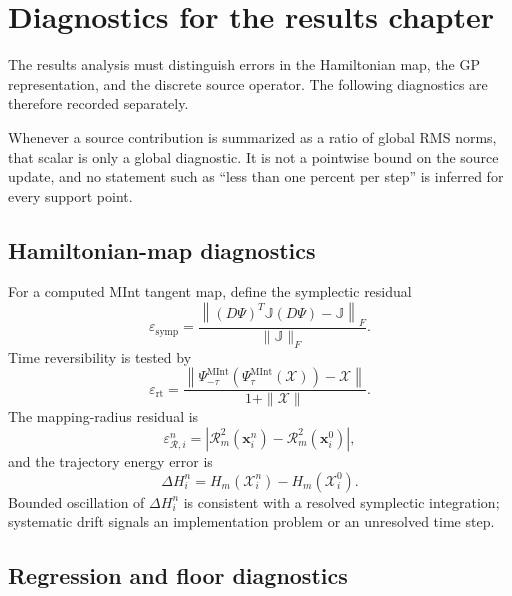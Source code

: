 \documentclass[
  11pt,
  letterpaper,
  onehalfspacing,
  normalmargins,
  equalmargins,
  oneside
]{ut-thesis}
\begin{document}
\section{Diagnostics for the results chapter}
\label{sec:ch5-diagnostics}

The results analysis must distinguish errors in the Hamiltonian map, the GP
representation, and the discrete source operator. The following diagnostics
are therefore recorded separately.

Whenever a source contribution is summarized as a ratio of global RMS norms,
that scalar is only a global diagnostic. It is not a pointwise bound on the
source update, and no statement such as ``less than one percent per step'' is
inferred for every support point.


\subsection{Hamiltonian-map diagnostics}
\label{subsec:ch5-map-diagnostics}

For a computed MInt tangent map, define the symplectic residual
\begin{equation}
\varepsilon_{\mathrm{symp}}
=
\frac{
\left\|
(D\Psi)^T\mathbb J(D\Psi)-\mathbb J
\right\|_F
}{
\|\mathbb J\|_F
}.
\label{eq:ch5-symplectic-residual}
\end{equation}
Time reversibility is tested by
\begin{equation}
\varepsilon_{\mathrm{rt}}
=
\frac{
\left\|
\Psi_{-\tau}^{\mathrm{MInt}}
\left(
\Psi_{\tau}^{\mathrm{MInt}}(\boldsymbol{\mathcal X})
\right)
-
\boldsymbol{\mathcal X}
\right\|
}{1+\|\boldsymbol{\mathcal X}\|}.
\label{eq:ch5-roundtrip-residual}
\end{equation}
The mapping-radius residual is
\begin{equation}
\varepsilon_{\mathcal R,i}^{n}
=
\left|
\mathcal R_m^2(\mathbf x_i^n)
-
\mathcal R_m^2(\mathbf x_i^0)
\right|,
\label{eq:ch5-radius-residual}
\end{equation}
and the trajectory energy error is
\begin{equation}
\Delta H_i^n
=
H_m(\boldsymbol{\mathcal X}_i^n)
-
H_m(\boldsymbol{\mathcal X}_i^0).
\label{eq:ch5-energy-residual}
\end{equation}
Bounded oscillation of \(\Delta H_i^n\) is consistent with a resolved
symplectic integration; systematic drift signals an implementation problem or
an unresolved time step.


\subsection{Regression and floor diagnostics}
\label{subsec:ch5-regression-diagnostics}
\end{document}
